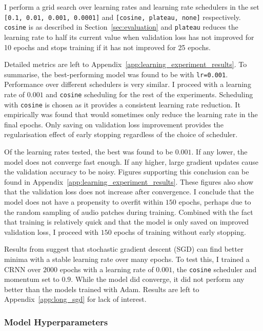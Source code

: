 I perform a grid search over learning rates and learning rate schedulers in the set \texttt{[0.1, 0.01, 0.001, 0.0001]} and \texttt{[cosine, plateau, none]} respectively. \texttt{cosine} is as described in Section~\ref{sec:evaluation} and \texttt{plateau} reduces the learning rate to half its current value when validation loss has not improved for 10 epochs and stops training if it has not improved for 25 epochs.

Detailed metrics are left to Appendix~\ref{app:learning_experiment_results}. To summarise, the best-performing model was found to be with \texttt{lr=0.001}. Performance over different schedulers is very similar. I proceed with a learning rate of $0.001$ and \texttt{cosine} scheduling for the rest of the experiments. Scheduling with \texttt{cosine} is chosen as it provides a consistent learning rate reduction. It empirically was found that  would sometimes only reduce the learning rate in the final epochs. Only saving on validation loss improvement provides the regularisation effect of early stopping regardless of the choice of scheduler.

Of the learning rates tested, the best was found to be $0.001$. If any lower, the model does not converge fast enough. If any higher, large gradient updates cause the validation accuracy to be noisy. Figures supporting this conclusion can be found in Appendix~\ref{app:learning_experiment_results}. These figures also show that the validation loss does not increase after convergence. I conclude that the model does not have a propensity to overfit within $150$ epochs, perhaps due to the random sampling of audio patches during training. Combined with the fact that training is relatively quick and that the model is only saved on improved validation loss, I proceed with $150$ epochs of training without early stopping.

Results from \citet{SGD1} suggest that stochastic gradient descent (SGD) can find better minima with a stable learning rate over many epochs. To test this, I trained a CRNN over $2000$ epochs with a learning rate of $0.001$, the \texttt{cosine} scheduler and momentum set to $0.9$. While the model did converge, it did not perform any better than the models trained with Adam. Results are left to Appendix~\ref{app:long_sgd} for lack of interest.

\subsubsection{Model Hyperparameters}\label{sec:model_hyperparameters}

